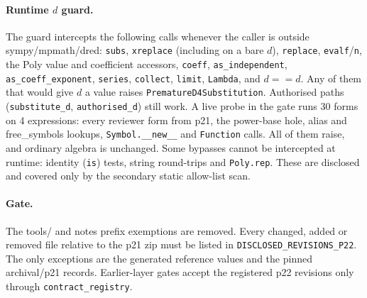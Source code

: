 \paragraph{Runtime $d$ guard.} The guard intercepts the following calls whenever the caller is outside
sympy/mpmath/dred: \texttt{subs}, \texttt{xreplace} (including on a bare $d$), \texttt{replace}, \texttt{evalf}/\texttt{n},
the Poly value and coefficient accessors, \texttt{coeff}, \texttt{as\_independent}, \texttt{as\_coeff\_exponent},
\texttt{series}, \texttt{collect}, \texttt{limit}, \texttt{Lambda}, and $d==d$. Any of them that would give $d$ a value
raises \texttt{PrematureD4Substitution}. Authorised paths (\texttt{substitute\_d}, \texttt{authorised\_d}) still work.
A live probe in the gate runs 30 forms on 4 expressions: every reviewer form from p21, the power-base hole, alias and
free\_symbols lookups, \texttt{Symbol.\_\_new\_\_} and \texttt{Function} calls. All of them raise, and ordinary algebra is unchanged.
Some bypasses cannot be intercepted at runtime: identity (\texttt{is}) tests, string round-trips and \texttt{Poly.rep}.
These are disclosed and covered only by the secondary static allow-list scan.

\paragraph{Gate.} The tools/ and notes prefix exemptions are removed. Every changed, added or removed file relative
to the p21 zip must be listed in \texttt{DISCLOSED\_REVISIONS\_P22}. The only exceptions are the generated reference
values and the pinned archival/p21 records. Earlier-layer gates accept the registered p22 revisions only through
\texttt{contract\_registry}.
